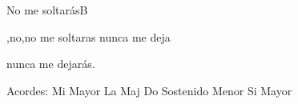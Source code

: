 \documentclass[12pt, spanish]{book}
\begin{document}
\begin{song}{No me soltarás}{B}
\begin{SBExtraKeys}
{\begin{SBOpGroup}
                ,no,no me soltaras  nunca me deja

                 nunca me dejarás.
            \end{SBOpGroup}

            \ifChordBk
            \begin{SBOpGroup}
                Acordes:\break
                \upchord{\E}\qquad Mi Mayor \hfill
                \upchord{\AMaj}\qquad La Maj \hfill\null\break
                \upchord{\Csm}Do Sostenido Menor \hfill
                \upchord{\B}\qquad Si Mayor \hfill\null\break
            \end{SBOpGroup}
            \fi
        }\end{SBExtraKeys}
    \end{song}
\end{document}
